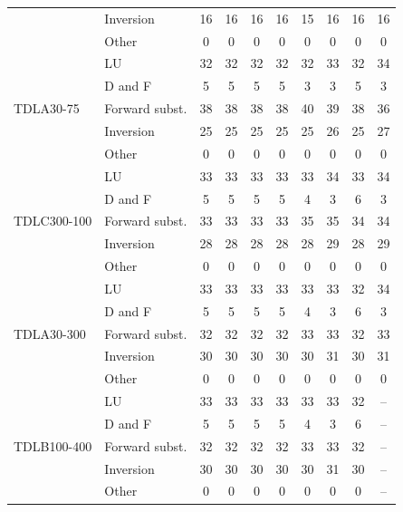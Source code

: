 \begin{table}[htbp]
\begin{tabular}{llcccccccc}
 & Inversion & 16 & 16 & 16 & 16 & 15 & 16 & 16 & 16 \\
 & Other & 0 & 0 & 0 & 0 & 0 & 0 & 0 & 0 \\
\midrule
\multirow{5}{*}{TDLA30-75} & LU & 32 & 32 & 32 & 32 & 32 & 33 & 32 & 34 \\
 & D and F & 5 & 5 & 5 & 5 & 3 & 3 & 5 & 3 \\
 & Forward subst. & 38 & 38 & 38 & 38 & 40 & 39 & 38 & 36 \\
 & Inversion & 25 & 25 & 25 & 25 & 25 & 26 & 25 & 27 \\
 & Other & 0 & 0 & 0 & 0 & 0 & 0 & 0 & 0 \\
\midrule
\multirow{5}{*}{TDLC300-100} & LU & 33 & 33 & 33 & 33 & 33 & 34 & 33 & 34 \\
 & D and F & 5 & 5 & 5 & 5 & 4 & 3 & 6 & 3 \\
 & Forward subst. & 33 & 33 & 33 & 33 & 35 & 35 & 34 & 34 \\
 & Inversion & 28 & 28 & 28 & 28 & 28 & 29 & 28 & 29 \\
 & Other & 0 & 0 & 0 & 0 & 0 & 0 & 0 & 0 \\
\midrule
\multirow{5}{*}{TDLA30-300} & LU & 33 & 33 & 33 & 33 & 33 & 33 & 32 & 34 \\
 & D and F & 5 & 5 & 5 & 5 & 4 & 3 & 6 & 3 \\
 & Forward subst. & 32 & 32 & 32 & 32 & 33 & 33 & 32 & 33 \\
 & Inversion & 30 & 30 & 30 & 30 & 30 & 31 & 30 & 31 \\
 & Other & 0 & 0 & 0 & 0 & 0 & 0 & 0 & 0 \\
\midrule
\multirow{5}{*}{TDLB100-400} & LU & 33 & 33 & 33 & 33 & 33 & 33 & 32 & -- \\
 & D and F & 5 & 5 & 5 & 5 & 4 & 3 & 6 & -- \\
 & Forward subst. & 32 & 32 & 32 & 32 & 33 & 33 & 32 & -- \\
 & Inversion & 30 & 30 & 30 & 30 & 30 & 31 & 30 & -- \\
 & Other & 0 & 0 & 0 & 0 & 0 & 0 & 0 & -- \\
\bottomrule
\end{tabular}
\vspace{4pt}
\end{table}

